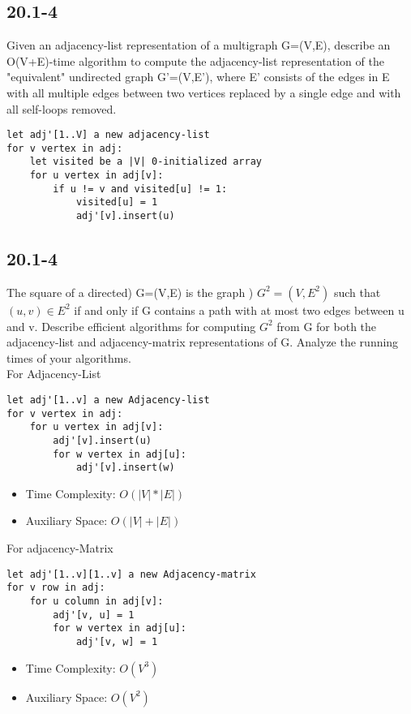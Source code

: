 \documentclass{article}
\begin{document}
\subsection{20.1-4}
Given an adjacency-list representation of a multigraph G=(V,E), describe an O(V+E)-time algorithm to compute the adjacency-list representation of the "equivalent" undirected graph G'=(V,E'), where E' consists of the edges in E with all multiple edges between two vertices replaced by a single edge and with all self-loops removed.

\begin{verbatim}
let adj'[1..V] a new adjacency-list
for v vertex in adj:
    let visited be a |V| 0-initialized array
    for u vertex in adj[v]:
        if u != v and visited[u] != 1:
            visited[u] = 1
            adj'[v].insert(u)
\end{verbatim}

\subsection{20.1-4}
The square of a directed) G=(V,E) is the graph ) $G^2=(V,E^2)$ such that  $(u,v) \in E^2$ if and only if G contains a path with at most two edges between u and v. Describe efficient algorithms for computing $G^2$ from G for both the adjacency-list and adjacency-matrix representations of G. Analyze the running times of your algorithms.
\\
For Adjacency-List
\begin{verbatim}
let adj'[1..v] a new Adjacency-list
for v vertex in adj:
    for u vertex in adj[v]:
        adj'[v].insert(u)
        for w vertex in adj[u]:
            adj'[v].insert(w)
\end{verbatim}
\begin{itemize}
\item Time Complexity: $O(|V|*|E|)$
\item Auxiliary Space: $O(|V| + |E|)$
\end{itemize}
For adjacency-Matrix
\begin{verbatim}
let adj'[1..v][1..v] a new Adjacency-matrix
for v row in adj:
    for u column in adj[v]:
        adj'[v, u] = 1
        for w vertex in adj[u]:
            adj'[v, w] = 1
\end{verbatim}
\begin{itemize}
\item Time Complexity: $O(V^3)$
\item Auxiliary Space: $O(V^2)$
\end{itemize}
\end{document}
